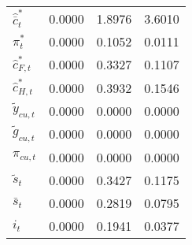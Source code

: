 \begin{center}
\begin{longtable}{lccc}
${\hat {\bar c}_t^*}  $	 & 	       0.0000	 & 	       1.8976	 & 	       3.6010 \\ 
${\pi_t^*}            $	 & 	       0.0000	 & 	       0.1052	 & 	       0.0111 \\ 
${\hat c_{F,t}^*}     $	 & 	       0.0000	 & 	       0.3327	 & 	       0.1107 \\ 
${\hat c_{H,t}^*}     $	 & 	       0.0000	 & 	       0.3932	 & 	       0.1546 \\ 
${\tilde y_{cu,t}}    $	 & 	       0.0000	 & 	       0.0000	 & 	       0.0000 \\ 
${\tilde g_{cu,t}}    $	 & 	       0.0000	 & 	       0.0000	 & 	       0.0000 \\ 
${\pi_{cu,t}}         $	 & 	       0.0000	 & 	       0.0000	 & 	       0.0000 \\ 
${\tilde s_t}         $	 & 	       0.0000	 & 	       0.3427	 & 	       0.1175 \\ 
${\bar s_t}           $	 & 	       0.0000	 & 	       0.2819	 & 	       0.0795 \\ 
${i_t}                $	 & 	       0.0000	 & 	       0.1941	 & 	       0.0377 \\ 
\end{longtable}
 \end{center}
